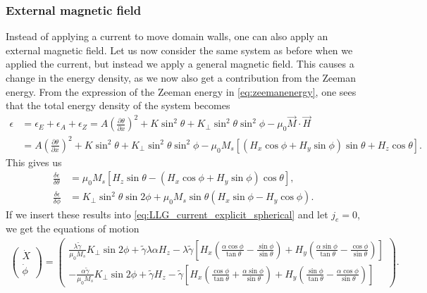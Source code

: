\documentclass[12pt, a4paper]{article}		%
\numberwithin{equation}{section}
\begin{document}
\subsubsection{External magnetic field}
Instead of applying a current to move domain walls, one can also apply an external magnetic field. Let us now consider the same system as before when we applied the current, but instead we apply a general magnetic field. This causes a change in the energy density, as we now also get a contribution from the Zeeman energy. From the expression of the Zeeman energy in \eqref{eq:zeemanenergy}, one sees that the total energy density of the system becomes
\begin{align}
\nonumber \epsilon&=\epsilon_E+\epsilon_A+\epsilon_Z=A (\frac{\partial \theta}{\partial x})^2 + K\sin^2\theta + K_{\perp} \sin^2\theta\sin^2\phi-\mu_0\vec{M}\cdot\vec{H} \\
&= A (\frac{\partial \theta}{\partial x})^2 + K\sin^2\theta + K_{\perp} \sin^2\theta\sin^2\phi-\mu_0M_s\left[(H_x\cos\phi+H_y\sin\phi)\sin\theta+ H_z\cos\theta\right].
\end{align}
This gives us
\begin{align}
\frac{\delta \epsilon}{\delta \theta} &= \mu_0M_s\left[H_z\sin\theta - (H_x\cos\phi+H_y\sin\phi)\cos\theta \right], \\
\frac{\delta \epsilon}{\delta \phi} &= K_{\perp}\sin^2\theta\sin2\phi + \mu_0M_s\sin\theta(H_x\sin\phi-H_y\cos\phi).
\end{align}
If we insert these results into \eqref{eq:LLG_current_explicit_spherical} and let $j_e=0$, we get the equations of motion
\begin{align}
\label{eq:xdot_phidot_hfield}
\begin{pmatrix}
\dot{X} \\ \dot{\phi}
\end{pmatrix} = 
\begin{pmatrix}
\frac{\lambda \tilde{\gamma}}{\mu_0M_s} K_{\perp} \sin2\phi  + \tilde{\gamma}\lambda\alpha H_z - \lambda\tilde{\gamma}\left[H_x(\frac{\alpha\cos\phi}{\tan\theta}-\frac{\sin\phi}{\sin\theta}) + H_y(\frac{\alpha\sin\phi}{\tan\theta}-\frac{\cos\phi}{\sin\theta}) \right] \\
-\frac{\alpha\tilde{\gamma}}{\mu_0M_s} K_{\perp}\sin2\phi + \tilde{\gamma} H_z - \tilde{\gamma}\left[H_x(\frac{\cos\phi}{\tan\theta}+\frac{\alpha\sin\phi}{\sin\theta}) + H_y(\frac{\sin\phi}{\tan\theta}-\frac{\alpha\cos\phi}{\sin\theta}) \right]
\end{pmatrix}.
\end{align}
\end{document}
